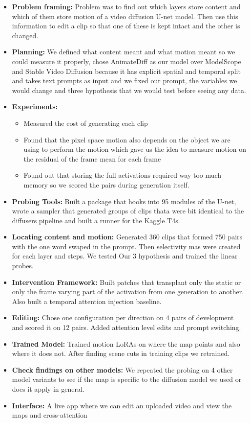 \documentclass[twoside,english]{article}
\begin{document}
\begin{itemize}
\item \textbf{Problem framing:} Problem was to find out which layers store content and which of them
store motion of a video diffusion U-net model. Then use this information to edit a clip so that one 
of these is kept intact and the other is changed.
\item \textbf{Planning:} We defined what content meant and what motion meant so we could measure it 
properly, chose AnimateDiff as our model over ModelScope and Stable Video Diffusion because it has
  explicit spatial and temporal split and takes text prompts as input and we fixed our prompt, the variables we would change and three hypothesis that we would test before seeing any data. 
\item \textbf{Experiments:} 
 \begin{itemize}
  \item Measured the cost of generating each clip
  \item Found that the pixel space motion also depends on the object we are using to perform the motion
  which gave us the idea to measure motion on the residual of the frame mean for each frame
  \item Found out that storing the full activations required way too much  memory so we scored the pairs
  during generation itself.
  \end{itemize}
\item \textbf{Probing Tools:} Built a package that hooks into 95 modules of the U-net, wrote a sampler
that generated groups of clips thata were bit identical to the diffusers pipeline and built a runner 
for the Kaggle T4s.
\item \textbf{Locating content and motion:} Generated 360 clips that formed 750 pairs with the one word
swaped in the prompt. Then selectivity mas were created for each layer and steps. We tested Our
3 hypothesis and trained the linear probes. 
\item \textbf{Intervention Framework:} Built patches that transplant only the static or only the frame varying
part of the activation from one generation to another. Also built a temporal attention injection baseline.
\item \textbf{Editing:} Chose one configuration per direction on 4 pairs of development and scored it on 12 pairs. 
Added attention level edits and prompt switching. 
\item \textbf{Trained Model:} Trained motion LoRAs on where the map points and also where it does not.
After finding scene cuts in training clips we retrained.
\item \textbf{Check findings on other models:} We repeated the probing on 4 other model variants to
see if the map is specific to the diffusion model we used or does it apply in general.  
\item \textbf{Interface:} A live app where we can edit an uploaded video and view the maps and cross-attention
\end{itemize}
\end{document}
